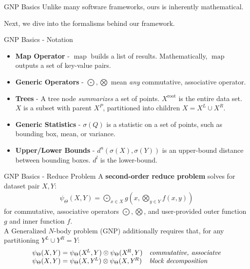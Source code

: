 \documentclass[pdf,colorBG,slideColor]{prosper}
\newcommand{\itemt}[1]{\item {\bf #1} -}
\newcommand{\union}{\cup}
\DeclareMathOperator*{\map}{map}
\newcommand{\gnp}{\psi_{\Theta}}
\newcommand{\defterm}[1]{{\bf #1}}
\newcommand{\kdroot}[1]{#1^{\text{root}}}
\newcommand{\kdleft}[1]{#1^{\!L}}
\newcommand{\kdright}[1]{#1^{\!R}}
\newcommand{\kdparent}[1]{#1^{\!P}}
\newcommand{\lo}[1]{#1^{l}}
\newcommand{\up}[1]{#1^{u}}
\newcommand{\distlo}{\lo{d}}
\newcommand{\distup}{\up{d}}
\newcommand{\outstat}{\sigma}
\begin{document}
\begin{slide}{GNP Basics}
  Unlike many software frameworks, ours is inherently mathematical.

  Next, we dive into the formalisms behind our framework.
\end{slide}

\begin{slide}{GNP Basics - Notation}
  \begin{itemize}
    \itemt{Map Operator} $\map$ builds a list of results.
    Mathematically, $\map$ outputs a set of key-value pairs.
    \itemt{Generic Operators} $\bigodot, \bigotimes$ mean {\em any} commutative, associative operator.
    \itemt{Trees} A tree node {\em summarizes} a set of points.
    $\kdroot{X}$ is the entire data set.
    $X$ is a subset with parent $\kdparent{X}$,
    partitioned into children $X = \kdleft{X} \union \kdright{X}$.
    \itemt{Generic Statistics} $\outstat(Q)$ is a statistic on a set of points,
    such as bounding box, mean, or variance.
    \itemt{Upper/Lower Bounds} $\distup(\outstat(X), \outstat(Y))$ is an upper-bound distance
    between bounding boxes.  $\distlo$ is the lower-bound.
  \end{itemize}
\end{slide}

\begin{slide}{GNP Basics - Reduce Problem}
  A \defterm{second-order reduce problem} solves for dataset pair $X, Y$:
    \[\begin{array}{l}
      \displaystyle \gnp(X, Y) = \bigodot_{x \in X} g\!\left(x, \bigotimes_{y \in Y} f(x, y) \right)
    \end{array}\]
  for commutative, associative operators $\bigodot, \bigotimes$, and user-provided
  outer function $g$ and inner function $f$.
  \\
  A Generalized $N$-body problem (GNP) additionally requires that, for any partitioning $\kdleft{Y} \union \kdright{Y} = Y$:
    \[\begin{array}{ll}
     \gnp(X,Y) = \gnp(\kdleft{X}, Y) \odot \gnp(\kdright{X},Y) & \text{\it commutative, associatve}
     \\
     \gnp(X,Y) = \gnp(X,\kdleft{Y}) \otimes \gnp(X,\kdright{Y}) & \text{\it block decomposition}
    \end{array}\]
\end{slide}
\end{document}
